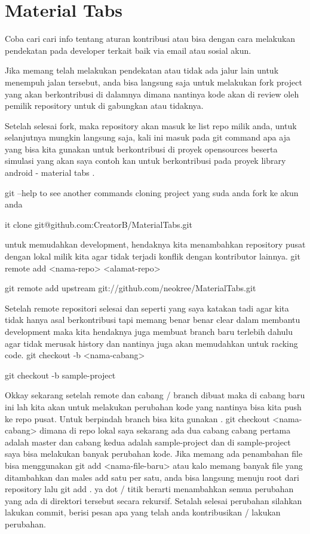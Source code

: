 \section{Material Tabs} \par
\noindent 
Coba cari cari info tentang aturan kontribusi atau bisa dengan cara melakukan pendekatan pada developer terkait baik via email atau sosial akun. \par
\noindent 
Jika memang telah melakukan pendekatan atau tidak ada jalur lain untuk menempuh jalan tersebut, anda bisa langsung saja untuk melakukan fork project yang akan berkontribusi di dalamnya dimana nantinya kode akan di review oleh pemilik repository untuk di gabungkan atau tidaknya. \par
\noindent 
Setelah selesai fork, maka repository akan masuk ke list repo milik anda, untuk selanjutnya mungkin langsung saja, kali ini masuk pada git command apa aja yang bisa kita gunakan untuk berkontribusi di proyek opensources beserta simulasi yang akan saya contoh kan untuk berkontribusi pada proyek library android - material tabs . \par
\vspace{12pt}
\noindent 
git --help to see another commands cloning project yang suda anda fork ke akun anda \par
\vspace{12pt}
\noindent 
it clone git@github.com:CreatorB/MaterialTabs.git \par
\noindent 
untuk memudahkan development, hendaknya kita menambahkan repository pusat dengan lokal milik kita agar tidak terjadi konflik dengan kontributor lainnya. git remote add <nama-repo> <alamat-repo> \par
\noindent 
git remote add upstream git://github.com/neokree/MaterialTabs.git \par
\noindent 
Setelah remote repositori selesai dan seperti yang saya katakan tadi agar kita tidak hanya asal berkontribusi tapi memang benar benar clear dalam membantu development maka kita hendaknya juga membuat branch baru terlebih dahulu agar tidak merusak history dan nantinya juga akan memudahkan untuk racking code. git checkout -b <nama-cabang> \par
\noindent 
git checkout -b sample-project \par
\noindent 
Okkay sekarang setelah remote dan cabang / branch dibuat maka di cabang baru ini lah kita akan untuk melakukan perubahan kode yang nantinya bisa kita push ke repo pusat. Untuk berpindah branch bisa kita gunakan . git checkout <nama-cabang> dimana di repo lokal saya sekarang ada dua cabang cabang pertama adalah master dan cabang kedua adalah sample-project dan di sample-project saya bisa melakukan banyak perubahan kode. Jika memang ada penambahan file bisa menggunakan git add <nama-file-baru> atau kalo memang banyak file yang ditambahkan dan males add satu per satu, anda bisa langsung menuju root dari repository lalu git add . ya dot / titik berarti menambahkan semua perubahan yang ada di direktori tersebut secara rekursif. Setalah selesai perubahan silahkan lakukan commit, berisi pesan apa yang telah anda kontribusikan / lakukan perubahan. \par
